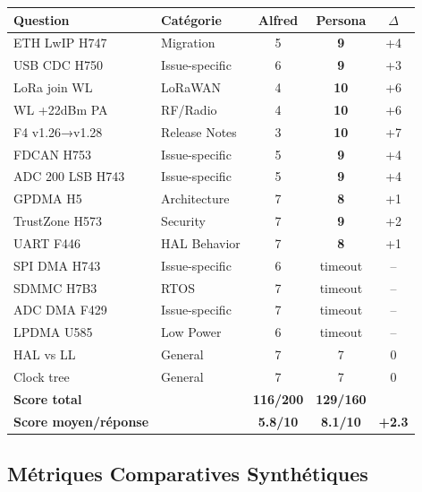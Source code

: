 \documentclass[12pt,a4paper]{report}
\begin{document}
\begin{longtable}{p{3cm}p{2.5cm}ccc}
\toprule
\textbf{Question} & \textbf{Catégorie} & \textbf{Alfred} & \textbf{Persona} & \textbf{$\Delta$} \\
\midrule
ETH LwIP H747 & Migration & 5 & \textbf{9} & +4 \\
USB CDC H750 & Issue-specific & 6 & \textbf{9} & +3 \\
LoRa join WL & LoRaWAN & 4 & \textbf{10} & +6 \\
WL +22dBm PA & RF/Radio & 4 & \textbf{10} & +6 \\
F4 v1.26→v1.28 & Release Notes & 3 & \textbf{10} & +7 \\
FDCAN H753 & Issue-specific & 5 & \textbf{9} & +4 \\
ADC 200 LSB H743 & Issue-specific & 5 & \textbf{9} & +4 \\
GPDMA H5 & Architecture & 7 & \textbf{8} & +1 \\
TrustZone H573 & Security & 7 & \textbf{9} & +2 \\
UART F446 & HAL Behavior & 7 & \textbf{8} & +1 \\
SPI DMA H743 & Issue-specific & 6 & timeout & -- \\
SDMMC H7B3 & RTOS & 7 & timeout & -- \\
ADC DMA F429 & Issue-specific & 7 & timeout & -- \\
LPDMA U585 & Low Power & 6 & timeout & -- \\
HAL vs LL & General & 7 & 7 & 0 \\
Clock tree & General & 7 & 7 & 0 \\
\midrule
\textbf{Score total} & & \textbf{116/200} & \textbf{129/160} & \\
\textbf{Score moyen/réponse} & & \textbf{5.8/10} & \textbf{8.1/10} & \textbf{+2.3} \\
\bottomrule
\end{longtable}

\subsection{Métriques Comparatives Synthétiques}
\end{document}
